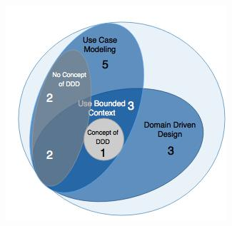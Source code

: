 \\

\\
\begin{figure}[H]
\begin{center}
\includegraphics[scale=0.5]{figures/question3_2}
\label{fig:hybris_architecture/interview/question3-2}
\end{center}
\end{figure}
\\
